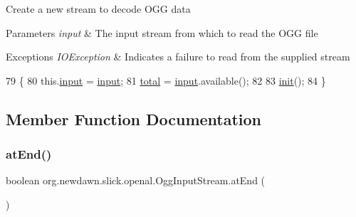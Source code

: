 Create a new stream to decode O\+GG data


\begin{DoxyParams}{Parameters}
{\em input} & The input stream from which to read the O\+GG file \\
\hline
\end{DoxyParams}

\begin{DoxyExceptions}{Exceptions}
{\em I\+O\+Exception} & Indicates a failure to read from the supplied stream \\
\hline
\end{DoxyExceptions}

\begin{DoxyCode}
79                                                                 \{
80         this.\mbox{\hyperlink{classorg_1_1newdawn_1_1slick_1_1openal_1_1_ogg_input_stream_ab6f4422dccd66dff43b69cf84f9bb791}{input}} = \mbox{\hyperlink{classorg_1_1newdawn_1_1slick_1_1openal_1_1_ogg_input_stream_ab6f4422dccd66dff43b69cf84f9bb791}{input}};
81         \mbox{\hyperlink{classorg_1_1newdawn_1_1slick_1_1openal_1_1_ogg_input_stream_a4a836a2e04a88ae3dd2ae6ed471f3958}{total}} = \mbox{\hyperlink{classorg_1_1newdawn_1_1slick_1_1openal_1_1_ogg_input_stream_ab6f4422dccd66dff43b69cf84f9bb791}{input}}.available();
82         
83         \mbox{\hyperlink{classorg_1_1newdawn_1_1slick_1_1openal_1_1_ogg_input_stream_a176448e8fa99bed81b3a3e104b2492e4}{init}}();
84     \}
\end{DoxyCode}


\subsection{Member Function Documentation}
\mbox{\label{classorg_1_1newdawn_1_1slick_1_1openal_1_1_ogg_input_stream_a66f42d8e0d5b2c31d638b065f2f3ea46}} 
\subsubsection{\texorpdfstring{at\+End()}{atEnd()}}
{\footnotesize\ttfamily boolean org.\+newdawn.\+slick.\+openal.\+Ogg\+Input\+Stream.\+at\+End (\begin{DoxyParamCaption}{ }\end{DoxyParamCaption})\hspace{0.3cm}{\ttfamily [inline]}}

